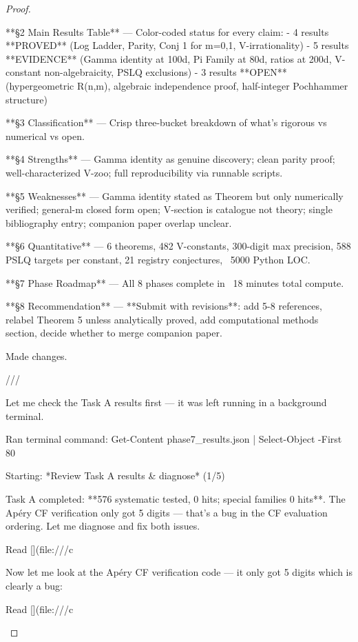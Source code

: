 \begin{theorem}
\begin{lemma}
\begin{proposition}
\begin{corollary}
\begin{proof}
\begin{remark}
**§2 Main Results Table** — Color-coded status for every claim:
- 4 results **PROVED** (Log Ladder, Parity, Conj 1 for m=0,1, V-irrationality)
- 5 results **EVIDENCE** (Gamma identity at 100d, Pi Family at 80d, ratios at 200d, V-constant non-algebraicity, PSLQ exclusions)
- 3 results **OPEN** (hypergeometric R(n,m), algebraic independence proof, half-integer Pochhammer structure)

**§3 Classification** — Crisp three-bucket breakdown of what's rigorous vs numerical vs open.

**§4 Strengths** — Gamma identity as genuine discovery; clean parity proof; well-characterized V-zoo; full reproducibility via runnable scripts.

**§5 Weaknesses** — Gamma identity stated as Theorem but only numerically verified; general-m closed form open; V-section is catalogue not theory; single bibliography entry; companion paper overlap unclear.

**§6 Quantitative** — 6 theorems, 482 V-constants, 300-digit max precision, 588 PSLQ targets per constant, 21 registry conjectures, ~5000 Python LOC.

**§7 Phase Roadmap** — All 8 phases complete in ~18 minutes total compute.

**§8 Recommendation** — **Submit with revisions**: add 5-8 references, relabel Theorem 5 unless analytically proved, add computational methods section, decide whether to merge companion paper.  



Made changes.


///

Let me check the Task A results first — it was left running in a background terminal. 

Ran terminal command: Get-Content phase7_results.json | Select-Object -First 80

Starting: *Review Task A results & diagnose* (1/5)

Task A completed: **576 systematic tested, 0 hits; special families 0 hits**. The Apéry CF verification only got 5 digits — that's a bug in the CF evaluation ordering. Let me diagnose and fix both issues. 

Read [](file:///c%

Now let me look at the Apéry CF verification code — it only got 5 digits which is clearly a bug: 

Read [](file:///c%


\end{remark}
\end{proof}
\end{corollary}
\end{proposition}
\end{lemma}
\end{theorem}
